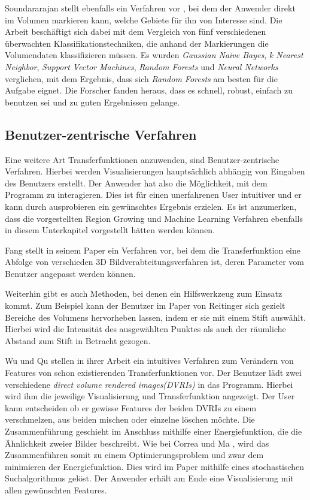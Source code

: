 Soundararajan stellt ebenfalls ein Verfahren vor \cite{soundararajan2015learning}, bei dem der Anwender direkt im Volumen markieren kann, welche Gebiete für ihn von Interesse sind.
\newline
Die Arbeit beschäftigt sich dabei mit dem Vergleich von fünf verschiedenen überwachten Klassifikationstechniken, die anhand der Markierungen die Volumendaten klassifizieren müssen. Es wurden \textit{Gaussian Naive Bayes}, \textit{k Nearest Neighbor}, \textit{Support Vector Machines}, \textit{Random Forests} und \textit{Neural Networks} verglichen, mit dem Ergebnis, dass sich \textit{Random Forests} am besten für die Aufgabe eignet. Die Forscher fanden heraus, dass es schnell, robust, einfach zu benutzen sei und zu guten Ergebnissen gelange.



\subsection{Benutzer-zentrische Verfahren}

Eine weitere Art Transferfunktionen anzuwenden, sind Benutzer-zentrische Verfahren. Hierbei werden Visualisierungen hauptsächlich abhängig von Eingaben des Benutzers erstellt.
Der Anwender hat also die Möglichkeit, mit dem Programm zu interagieren. Dies ist für einen unerfahrenen User intuitiver und er kann durch ausprobieren ein gewünschtes Ergebnis erzielen.
Es ist anzumerken, dass die vorgestellten Region Growing und Machine Learning Verfahren ebenfalls in diesem Unterkapitel vorgestellt hätten werden können.


Fang stellt in seinem Paper \cite{fang1998image} ein Verfahren vor, bei dem die  Transferfunktion eine Abfolge von verschieden 3D Bildverabteitungsverfahren ist, deren Parameter vom Benutzer angepasst werden können.


Weiterhin gibt es auch Methoden, bei denen ein Hilfswerkzeug zum Einsatz kommt. Zum Beispiel kann der Benutzer im Paper von Reitinger \cite{reitinger2004user} sich gezielt Bereiche des Volumens hervorheben lassen, indem er sie mit einem Stift auswählt.
Hierbei wird die Intensität des ausgewählten Punktes als auch der räumliche Abstand zum Stift in Betracht gezogen.


Wu und Qu stellen in ihrer Arbeit \cite{wu2007interactive} ein intuitives Verfahren zum Verändern von Features von schon existierenden Transferfunktionen vor.
Der Benutzer lädt zwei verschiedene \textit{direct volume rendered images(DVRIs)} in das Programm. Hierbei wird ihm die jeweilige Visualisierung und Transferfunktion angezeigt. Der User kann entscheiden ob er gewisse Features der beiden DVRIs zu einem verschmelzen, aus beiden mischen oder einzelne löschen möchte.
Die Zusammenführung geschieht im Anschluss mithilfe einer Energiefunktion, die die Ähnlichkeit zweier Bilder beschreibt. Wie bei Correa und Ma \cite{correa2009visibility}, wird das Zusammenführen somit zu einem Optimierungsproblem und zwar dem minimieren der Energiefunktion. Dies wird im Paper mithilfe eines stochastischen Suchalgorithmus gelöst.
Der Anwender erhält am Ende eine Visualisierung mit allen gewünschten Features.


